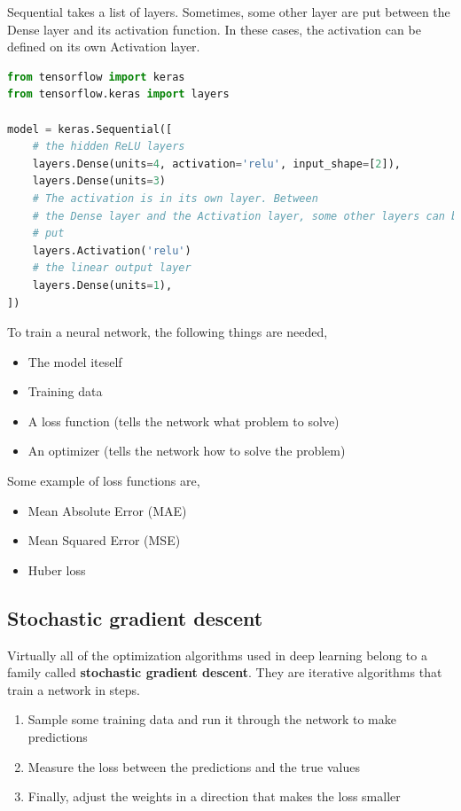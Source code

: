 \noindent Sequential takes a list of layers. Sometimes, some other
layer are put between the Dense layer and its activation function. In
these cases, the activation can be defined on its own Activation layer.

\begin{lstlisting}[language=Python]
from tensorflow import keras
from tensorflow.keras import layers

model = keras.Sequential([
    # the hidden ReLU layers
    layers.Dense(units=4, activation='relu', input_shape=[2]),
    layers.Dense(units=3)
    # The activation is in its own layer. Between
    # the Dense layer and the Activation layer, some other layers can be 
    # put
    layers.Activation('relu')
    # the linear output layer 
    layers.Dense(units=1),
])
\end{lstlisting}

\noindent To train a neural network, the following things are needed,
\begin{itemize}
	\item The model iteself
	\item Training data
	\item A loss function (tells the network what problem to solve)
	\item An optimizer (tells the network how to solve the problem)
\end{itemize}

\noindent Some example of loss functions are,
\begin{itemize}
	\item Mean Absolute Error (MAE)
	\item Mean Squared Error (MSE)
	\item Huber loss
\end{itemize}

\subsection{Stochastic gradient descent}
\noindent Virtually all of the optimization algorithms used in deep learning
belong to a family called \textbf{stochastic gradient descent}. They are
iterative algorithms that train a network in steps.
\begin{enumerate}
	\item Sample some training data and run it through the network to make
		predictions
	\item Measure the loss between the predictions and the true values
	\item Finally, adjust the weights in a direction that makes the loss smaller
\end{enumerate}

